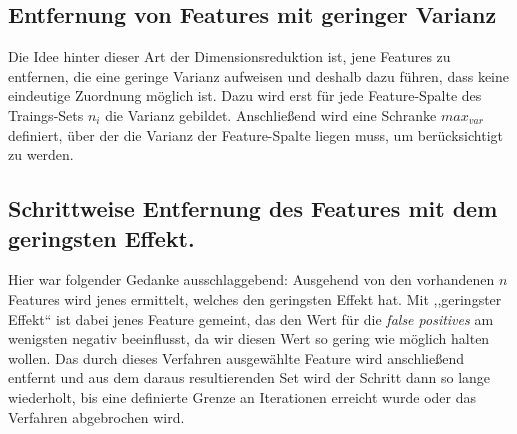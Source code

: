 \subsection{Entfernung von Features mit geringer Varianz}

Die Idee hinter dieser Art der Dimensionsreduktion ist, jene Features zu entfernen, die eine geringe Varianz aufweisen und deshalb dazu führen, dass keine eindeutige Zuordnung möglich ist. Dazu wird erst für jede Feature-Spalte des Traings-Sets $n_i$ die Varianz gebildet. Anschließend wird eine Schranke $max_{var}$ definiert, über der die Varianz der Feature-Spalte liegen muss, um berücksichtigt zu werden.

\subsection{Schrittweise Entfernung des Features mit dem geringsten Effekt.}

Hier war folgender Gedanke ausschlaggebend: Ausgehend von den vorhandenen $n$ Features wird jenes ermittelt, welches den geringsten Effekt hat. Mit ,,geringster Effekt`` ist dabei jenes Feature gemeint, das den Wert für die \textit{false positives} am wenigsten negativ beeinflusst, da wir diesen Wert so gering wie möglich halten wollen. Das durch dieses Verfahren ausgewählte Feature wird anschließend entfernt und aus dem daraus resultierenden Set wird der Schritt dann so lange wiederholt, bis eine definierte Grenze an Iterationen erreicht wurde oder das Verfahren abgebrochen wird.
